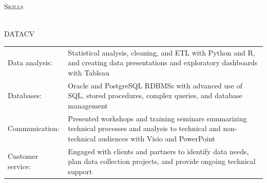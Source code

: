 \documentclass[letterpaper]{article}
\newcommand{\lineunder} {
        \vspace*{-8pt} \\
        \hspace*{-18pt} \hrulefill \\
    }
\newcommand{\header} [1] {
        \vspace{3pt}
        {\hspace*{-18pt}\vspace*{6pt} \textsc{#1}}
        \vspace*{-6pt} \lineunder
        \vspace{3pt}
    }
\newenvironment{skillslist}
        {
            \begin{tabular}[t]{ l L{5.17in} }
        }{
            \end{tabular}
        }
\begin{document}
\header{Skills}
    \begin{taggedblock}{DATACV}
        \begin{skillslist}
            Data analysis: &
                Statistical analysis, cleaning, and ETL with Python and R, 
                and creating data presentations and exploratory dashboards with
                Tableau
                \\
            Databases: & 
                Oracle and PostgreSQL RDBMSs with advanced use of SQL, stored
                procedures, complex queries, and database management
                \\
            Communication: &
                Presented workshops and training seminars summarizing technical
                processes and analysis to technical and non-technical audiences
                with Visio and PowerPoint
                \\
            Customer service: &
                Engaged with clients and partners to identify data needs, plan data
                collection projects, and provide ongoing technical support
                \\
        \end{skillslist}
    \end{taggedblock}
\end{document}

